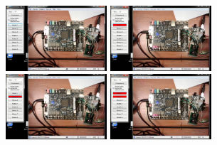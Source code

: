 \documentclass[a4paper]{article}
\begin{document}
  \begin{figure}[H]
    \centering
    \includegraphics[width=0.335\textwidth, angle=90]{02_70}
    \hfill
    \includegraphics[width=0.335\textwidth, angle=90]{02_71}
    \hfill
    \includegraphics[width=0.335\textwidth, angle=90]{02_72}
    \hfill
    \includegraphics[width=0.335\textwidth, angle=90]{02_73}
    \vspace{0.15cm}


\end{figure}
\end{document}
